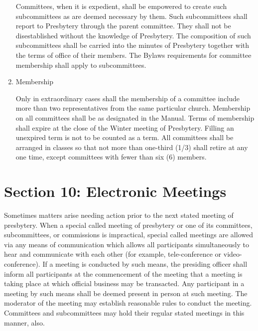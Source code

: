 \documentclass[
]{book}
\begin{document}
\begin{enumerate}
  Committees, when it is expedient, shall be empowered to create such subcommittees as are deemed necessary by them. Such subcommittees shall report to Presbytery through the parent committee. They shall not be disestablished without the knowledge of Presbytery. The composition of such subcommittees shall be carried into the minutes of Presbytery together with the terms of office of their members. The Bylaws requirements for committee membership shall apply to subcommittees.
\item
  Membership

  Only in extraordinary cases shall the membership of a committee include more than two representatives from the same particular church. Membership on all committees shall be as designated in the Manual. Terms of membership shall expire at the close of the Winter meeting of Presbytery. Filling an unexpired term is not to be counted as a term. All committees shall be arranged in classes so that not more than one-third (1/3) shall retire at any one time, except committees with fewer than six (6) members.
\end{enumerate}

\hypertarget{section-10-electronic-meetings}{%
\section{Section 10: Electronic Meetings}\label{section-10-electronic-meetings}}

Sometimes matters arise needing action prior to the next stated meeting of presbytery. When a special called meeting of presbytery or one of its committees, subcommittees, or commissions is impractical, special called meetings are allowed via any means of communication which allows all participants simultaneously to hear and communicate with each other (for example, tele-conference or video-conference). If a meeting is conducted by such means, the presiding officer shall inform all participants at the commencement of the meeting that a meeting is taking place at which official business may be transacted. Any participant in a meeting by such means shall be deemed present in person at such meeting. The moderator of the meeting may establish reasonable rules to conduct the meeting. Committees and subcommittees may hold their regular stated meetings in this manner, also.
\end{document}
